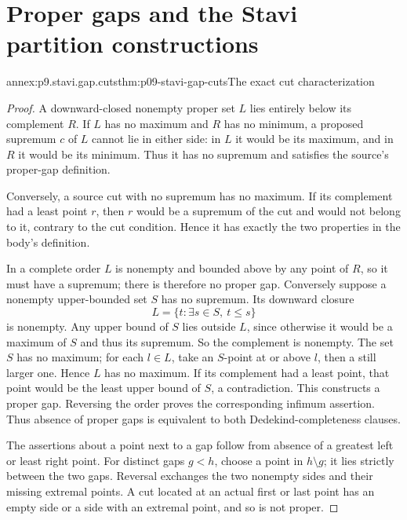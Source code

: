 
\section{Proper gaps and the Stavi partition constructions}
\label{sec:annex-p09-stavi-gap-temporal-logic}

\begin{annexitem}{annex:p9.stavi.gap.cuts}{thm:p09-stavi-gap-cuts}{The exact cut characterization}
\begin{proof}
A downward-closed nonempty proper set \(L\) lies entirely
below its complement \(R\). If \(L\) has no maximum
and \(R\) has no minimum, a proposed supremum \(c\)
of \(L\) cannot lie in either side: in \(L\) it would
be its maximum, and in \(R\) it would be its minimum.
Thus it has no supremum and satisfies the source's
proper-gap definition.

Conversely, a source cut with no supremum has no
maximum. If its complement had a least point \(r\),
then \(r\) would be a supremum of the cut and
would not belong to it, contrary to the cut
condition. Hence it has exactly the two properties
in the body's definition.

In a complete order \(L\) is nonempty and bounded
above by any point of \(R\), so it must have
a supremum; there is therefore no proper gap.
Conversely suppose a nonempty upper-bounded set
\(S\) has no supremum. Its downward closure
\[
                   L=\{t:\exists s\in S,\ t\leq s\}
\]
is nonempty. Any upper bound of \(S\) lies
outside \(L\), since otherwise it would be
a maximum of \(S\) and thus its supremum.
So the complement is nonempty. The set \(S\)
has no maximum; for each \(l\in L\), take
an \(S\)-point at or above \(l\), then a
still larger one. Hence \(L\) has no
maximum. If its complement had a least
point, that point would be the least
upper bound of \(S\), a contradiction.
This constructs a proper gap. Reversing
the order proves the corresponding
infimum assertion. Thus absence of
proper gaps is equivalent to both
Dedekind-completeness clauses.

The assertions about a point next
to a gap follow from absence of
a greatest left or least right
point. For distinct gaps \(g<h\),
choose a point in \(h\setminus g\);
it lies strictly between the
two gaps. Reversal exchanges
the two nonempty sides and
their missing extremal points.
A cut located at an actual
first or last point has an
empty side or a side with
an extremal point, and so
is not proper.
\end{proof}
\end{annexitem}

